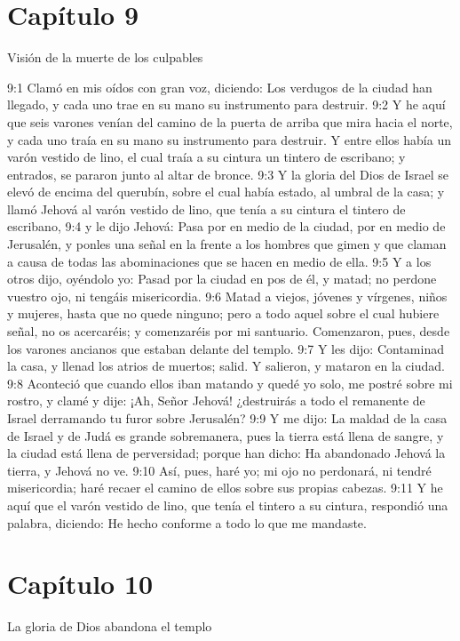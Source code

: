 \section*{Capítulo 9 } 
Visión de la muerte de los culpables   
  
9:1 Clamó en mis oídos con gran voz, diciendo: Los verdugos de la ciudad han llegado, y cada uno trae en su mano su instrumento para destruir.   
9:2 Y he aquí que seis varones venían del camino de la puerta de arriba que mira hacia el norte, y cada uno traía en su mano su instrumento para destruir. Y entre ellos había un varón vestido de lino, el cual traía a su cintura un tintero de escribano; y entrados, se pararon junto al altar de bronce.   
9:3 Y la gloria del Dios de Israel se elevó de encima del querubín, sobre el cual había estado, al umbral de la casa; y llamó Jehová al varón vestido de lino, que tenía a su cintura el tintero de escribano,   
9:4 y le dijo Jehová: Pasa por en medio de la ciudad, por en medio de Jerusalén, y ponles una señal en la frente a los hombres que gimen y que claman a causa de todas las abominaciones que se hacen en medio de ella.   
9:5 Y a los otros dijo, oyéndolo yo: Pasad por la ciudad en pos de él, y matad; no perdone vuestro ojo, ni tengáis misericordia.   
9:6 Matad a viejos, jóvenes y vírgenes, niños y mujeres, hasta que no quede ninguno; pero a todo aquel sobre el cual hubiere señal, no os acercaréis; y comenzaréis por mi santuario. Comenzaron, pues, desde los varones ancianos que estaban delante del templo.   
9:7 Y les dijo: Contaminad la casa, y llenad los atrios de muertos; salid. Y salieron, y mataron en la ciudad.   
9:8 Aconteció que cuando ellos iban matando y quedé yo solo, me postré sobre mi rostro, y clamé y dije: ¡Ah, Señor Jehová! ¿destruirás a todo el remanente de Israel derramando tu furor sobre Jerusalén?   
9:9 Y me dijo: La maldad de la casa de Israel y de Judá es grande sobremanera, pues la tierra está llena de sangre, y la ciudad está llena de perversidad; porque han dicho: Ha abandonado Jehová la tierra, y Jehová no ve.   
9:10 Así, pues, haré yo; mi ojo no perdonará, ni tendré misericordia; haré recaer el camino de ellos sobre sus propias cabezas.   
9:11 Y he aquí que el varón vestido de lino, que tenía el tintero a su cintura, respondió una palabra, diciendo: He hecho conforme a todo lo que me mandaste.   
\section*{Capítulo 10  }
La gloria de Dios abandona el templo   
  
